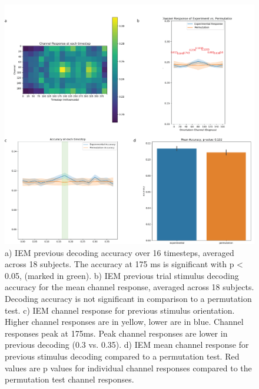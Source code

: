 \documentclass[../main.tex]{subfiles}
\begin{document}
\begin{figure}[h]
    \centering
    \includegraphics[scale=0.7]{figures/results/iem_results_prev.png}
    \caption{a) IEM previous decoding accuracy over 16 timesteps, averaged across 18 subjects. The accuracy at 175 ms is significant with p < 0.05, (marked in green). b) IEM previous trial stimulus decoding accuracy for the mean channel response, averaged across 18 subjects. Decoding accuracy is not significant in comparison to a permutation test. c) IEM channel response for previous stimulus orientation. Higher channel responses are in yellow, lower are in blue. Channel responses peak at 175ms. Peak channel responses are lower in previous decoding (0.3 vs. 0.35). d) IEM mean channel response for previous stimulus decoding compared to a permutation test. Red values are p values for individual channel responses compared to the permutation test channel responses.}
    \label{iem_results_prev}
\end{figure}
\end{document}
